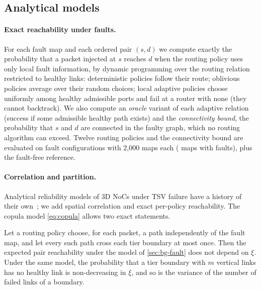 \begin{table}[tbp]
\centering
\caption{Channel-dependency verdicts ($8\times8\times4$ mesh, two VCs; VPC with 16 elevators). Shortest cycle: number of channels of the shortest dependency cycle.}
\label{tab:cdg}
\small

\end{table}

\subsection{Analytical models}
\label{sec:analytical}

\paragraph{Exact reachability under faults.} For each fault map and each ordered pair $(s,d)$ we compute exactly the probability that a packet injected at $s$ reaches $d$ when the routing policy uses only local fault information, by dynamic programming over the routing relation restricted to healthy links: deterministic policies follow their route; oblivious policies average over their random choices; local adaptive policies choose uniformly among healthy admissible ports and fail at a router with none (they cannot backtrack). We also compute an \emph{oracle} variant of each adaptive relation (success if some admissible healthy path exists) and the \emph{connectivity bound}, the probability that $s$ and $d$ are connected in the faulty graph, which no routing algorithm can exceed. Twelve routing policies and the connectivity bound are evaluated on  fault configurations with 2,000 maps each ( maps with faults), plus the fault-free reference.

\paragraph{Correlation and partition.} Analytical reliability models of 3D NoCs under TSV failure have a history of their own~\cite{khayambashi2015reliability,salamat2016resilient}; we add spatial correlation and exact per-policy reachability. The copula model \eqref{eq:copula} allows two exact statements.

\begin{theorem}\label{thm:corr}
Let a routing policy choose, for each packet, a path independently of the fault map, and let every such path cross each tier boundary at most once. Then the expected pair reachability under the model of \cref{sec:bg-fault} does not depend on $\xi$. Under the same model, the probability that a tier boundary with $m$ vertical links has no healthy link is non-decreasing in $\xi$, and so is the variance of the number of failed links of a boundary.
\end{theorem}

